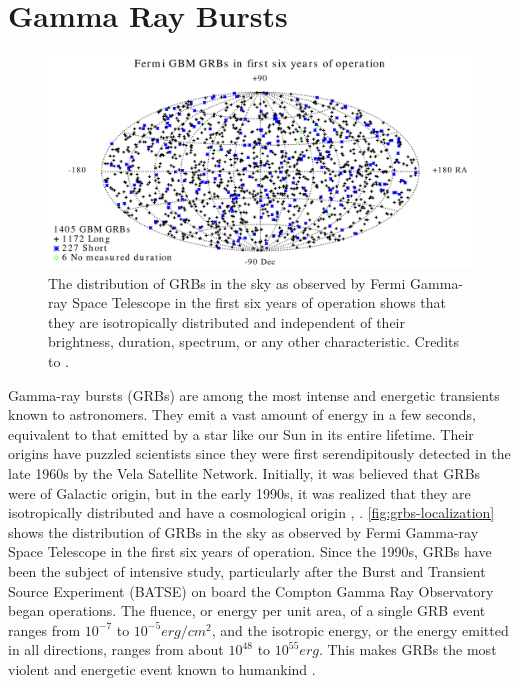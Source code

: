 \section{Gamma Ray Bursts}
\label{s:Gamma-Ray-Bursts}
\begin{figure}[t]
\centering
\includegraphics[width=0.9\linewidth]{figures/introduction/grbs.png}
\caption{The distribution of GRBs in the sky as observed by Fermi Gamma-ray Space Telescope in the first six years of operation shows that they are isotropically distributed and independent of their brightness, duration, spectrum, or any other characteristic. Credits to \cite{fermiwebsite}.}
\label{fig:grbs-localization}
\end{figure}
Gamma-ray bursts (GRBs) are among the most intense and energetic transients known to astronomers. They emit a vast amount of energy in a few seconds, equivalent to that emitted by a star like our Sun in its entire lifetime. Their origins have puzzled scientists since they were first serendipitously detected in the late 1960s by the Vela Satellite Network. Initially, it was believed that GRBs were of Galactic origin, but in the early 1990s, it was realized that they are isotropically distributed and have a cosmological origin \cite{mao_paczynski_1992}, \cite{meegan_fishman_wilson_1992}. \autoref{fig:grbs-localization} shows the distribution of GRBs in the sky as observed by Fermi Gamma-ray Space Telescope in the first six years of operation. Since the 1990s, GRBs have been the subject of intensive study, particularly after the Burst and Transient Source Experiment (BATSE) on board the Compton Gamma Ray Observatory began operations. The fluence, or energy per unit area, of a single GRB event ranges from $10^{-7}$ to $10^{-5} erg/cm^2$, and the isotropic energy, or the energy emitted in all directions, ranges from about $10^{48}$ to $10^{55} erg$. This makes GRBs the most violent and energetic event known to humankind \cite{Kumar_Zhang_2015}.
